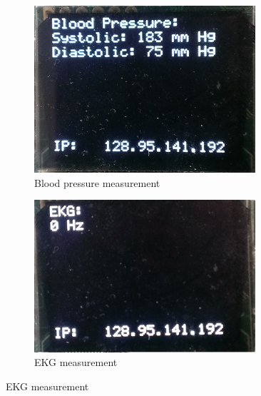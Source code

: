 \documentclass[12pt]{article} %
\begin{document}
\begin{itemize}
\begin{figure}[p]
			\begin{subfigure}[t]{0.48\textwidth}
				\centering
				\includegraphics[width=0.9\textwidth]{../design/oled_pressure.jpg}
				\caption{Blood pressure measurement}
				\label{fig:pressure_disp}
			\end{subfigure}
			\hfill
			\begin{subfigure}[t]{0.48\textwidth}
				\centering
				\includegraphics[width=0.9\textwidth]{../design/oled_ekg.jpg}
				\caption{EKG measurement}
				\label{fig:ekg_disp}
			\end{subfigure}


\end{figure}
\end{itemize}
\end{document}
